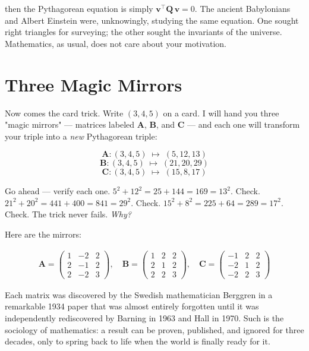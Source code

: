 \documentclass[11pt,twoside,openright]{book}
\theoremstyle{definition}
\theoremstyle{remark}
\begin{document}
then the Pythagorean equation is simply $\mathbf{v}^\top \mathbf{Q}\, \mathbf{v} = 0$. The ancient Babylonians and Albert Einstein were, unknowingly, studying the same equation. One sought right triangles for surveying; the other sought the invariants of the universe. Mathematics, as usual, does not care about your motivation.


\section{Three Magic Mirrors}

Now comes the card trick. Write $(3, 4, 5)$ on a card. I will hand you three "magic mirrors" --- matrices labeled $\mathbf{A}$, $\mathbf{B}$, and $\mathbf{C}$ --- and each one will transform your triple into a \textit{new} Pythagorean triple:

\[\mathbf{A}: (3, 4, 5) \;\longmapsto\; (5, 12, 13)\]
\[\mathbf{B}: (3, 4, 5) \;\longmapsto\; (21, 20, 29)\]
\[\mathbf{C}: (3, 4, 5) \;\longmapsto\; (15, 8, 17)\]

Go ahead --- verify each one. $5^2 + 12^2 = 25 + 144 = 169 = 13^2$. Check. $21^2 + 20^2 = 441 + 400 = 841 = 29^2$. Check. $15^2 + 8^2 = 225 + 64 = 289 = 17^2$. Check. The trick never fails. \textit{Why?}

Here are the mirrors:

\begin{align*}
\mathbf{A} = \begin{pmatrix} 1 & -2 & 2 \\ 2 & -1 & 2 \\ 2 & -2 & 3 \end{pmatrix}, \quad
\mathbf{B} = \begin{pmatrix} 1 & 2 & 2 \\ 2 & 1 & 2 \\ 2 & 2 & 3 \end{pmatrix}, \quad
\mathbf{C} = \begin{pmatrix} -1 & 2 & 2 \\ -2 & 1 & 2 \\ -2 & 2 & 3 \end{pmatrix}
\end{align*}


Each matrix was discovered by the Swedish mathematician Berggren in a remarkable 1934 paper that was almost entirely forgotten until it was independently rediscovered by Barning in 1963 and Hall in 1970. Such is the sociology of mathematics: a result can be proven, published, and ignored for three decades, only to spring back to life when the world is finally ready for it.
\end{document}
